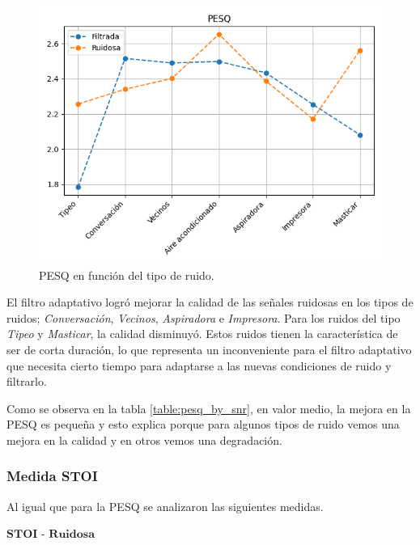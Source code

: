 \begin{figure}
	\centering
	\centerline{\includegraphics[scale=0.75]{images/ch6/pesq_by_noise_type.png}}
	\caption{PESQ en función del tipo de ruido.}
	\label{fig:ch6_pesq_by_noise_type}
\end{figure} 

El filtro adaptativo logró mejorar la calidad de las señales ruidosas en los tipos de ruidos; \emph{Conversación}, \emph{Vecinos}, \emph{Aspiradora} e \emph{Impresora}. Para los ruidos del tipo \emph{Tipeo} y \emph{Masticar}, la calidad disminuyó. Estos ruidos tienen la característica de ser de corta duración, lo que representa un inconveniente para el filtro adaptativo que necesita cierto tiempo para adaptarse a las nuevas condiciones de ruido y filtrarlo.

Como se observa en la tabla \ref{table:pesq_by_snr}, en valor medio, la mejora en la PESQ es pequeña y esto explica porque para algunos tipos de ruido vemos una mejora en la calidad y en otros vemos una degradación.

\subsubsection{Medida STOI}

Al igual que para la PESQ se analizaron las siguientes medidas.

\vspace{5mm}

\noindent $\textbf{STOI - Ruidosa}$

\vspace{5mm}

